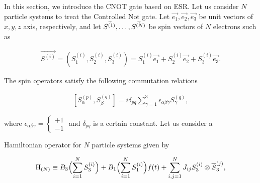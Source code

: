 \smallskip




In this section, we introduce the CNOT gate based on ESR. Let us consider $N 

$ particle systems to treat the Controlled Not gate. Let $\vec{e_1},\vec{e_2}%

,\vec{e_3}$ be unit vectors of $x,y,z$ axis, respectively, and let $\vec{%

S^{(1)}},\dots,\vec{S^{(N)}}$ be spin vectors of $N$ electrons such as 

\begin{eqnarray*}

\vec{S^{(i)}}=(S_{1}^{(i)},S_{2}^{(i)},S_{3}^{(i)})=S_{1}^{(i)}\vec{e_{1}}%

+S_{2}^{(i)}\vec{e_{2}}+S_{3}^{(i)}\vec{e_{3}}.

\end{eqnarray*}

The spin operators satisfy the following commutation relations 

\begin{eqnarray*}

[S_{\alpha}^{(p)},S_{\beta}^{(q)}]=i

\delta_{pq}\sum_{\gamma=1}^{3}\epsilon_{\alpha\beta\gamma}S_{\gamma}^{(q)},

\end{eqnarray*}

where ${\epsilon_{\alpha\beta\gamma}}=\left\{%

\begin{array}{c}

+1 \\ 

-1%

\end{array}%

\right.$ and $\delta_{pq}$ is a certain constant. Let us consider a

Hamiltonian operator for $N$ particle systems given by 

\begin{eqnarray*}

\mathrm{H}_{(N)}\equiv

B_{3}\Bigl(\sum_{i=1}^{N}S_{3}^{(i)}\Bigr)+B_{1}\Bigl(

\sum_{i=1}^{N}S_{1}^{(i)} \Bigr)f(t)+%

\sum_{i,j=1}^{N}J_{ij}S_{3}^{(i)}\otimes\overline{S}_{3}^{(j)},

\end{eqnarray*}

